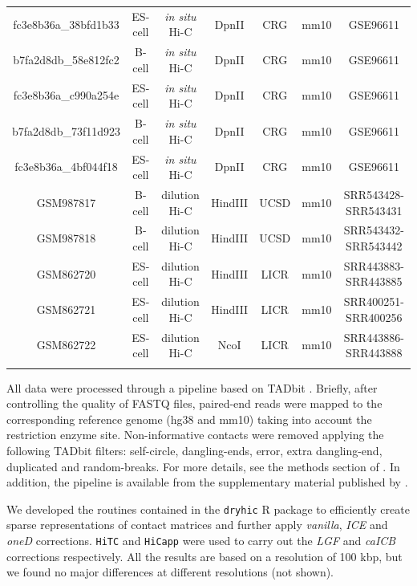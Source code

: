 \documentclass{bioinfo}
\begin{document}
\begin{methods}
\begin{table}
{\begin{tabular}{ccccccc}
fc3e8b36a\_38bfd1b33 & ES-cell & \textit{in situ} Hi-C &
  DpnII & CRG & mm10 & GSE96611 \\
b7fa2d8db\_58e812fc2 & B-cell  & \textit{in situ} Hi-C &
  DpnII & CRG & mm10 & GSE96611 \\
fc3e8b36a\_c990a254e & ES-cell & \textit{in situ} Hi-C &
  DpnII & CRG & mm10 & GSE96611 \\
b7fa2d8db\_73f11d923 & B-cell  & \textit{in situ} Hi-C &
  DpnII & CRG & mm10 & GSE96611 \\
fc3e8b36a\_4bf044f18 & ES-cell & \textit{in situ} Hi-C &
  DpnII & CRG & mm10 & GSE96611 \\
GSM987817 & B-cell  & dilution Hi-C &
  HindIII & UCSD & mm10 & SRR543428-SRR543431 \\
GSM987818 & B-cell  & dilution Hi-C &
  HindIII & UCSD & mm10 & SRR543432-SRR543442 \\
GSM862720 & ES-cell & dilution Hi-C &
  HindIII & LICR & mm10 & SRR443883-SRR443885 \\
GSM862721 & ES-cell & dilution Hi-C &
  HindIII & LICR & mm10 & SRR400251-SRR400256 \\
GSM862722 & ES-cell & dilution Hi-C &
  NcoI    & LICR & mm10 & SRR443886-SRR443888 \\
  \botrule
\end{tabular}}{}
\end{table}


All data were processed through a pipeline based on TADbit
\citep{serra2016structural}. Briefly, after controlling the quality of
FASTQ files, paired-end reads were mapped to the corresponding reference
genome (hg38 and mm10) taking into account the restriction enzyme site.
Non-informative contacts were removed applying the following TADbit
filters: self-circle, dangling-ends, error, extra dangling-end, duplicated
and random-breaks. For more details, see the methods section of
\cite{stadhouders2017transcription}. In addition, the pipeline is
available from the supplementary material published by
\cite{quilez2017managing}.

We developed the routines contained in the \texttt{dryhic} R package to
efficiently create sparse representations of contact matrices and further
apply \textit{vanilla}, \textit{ICE} and \textit{oneD} corrections.
\texttt{HiTC} \citep{servant2012hitc} and \texttt{HiCapp}
\citep{wu2016computational} were used to carry out the \textit{LGF} and
\textit{caICB} corrections respectively. All the results are based on a
resolution of 100 kbp, but we found no major differences at different
resolutions (not shown).




\end{methods}
\end{document}
